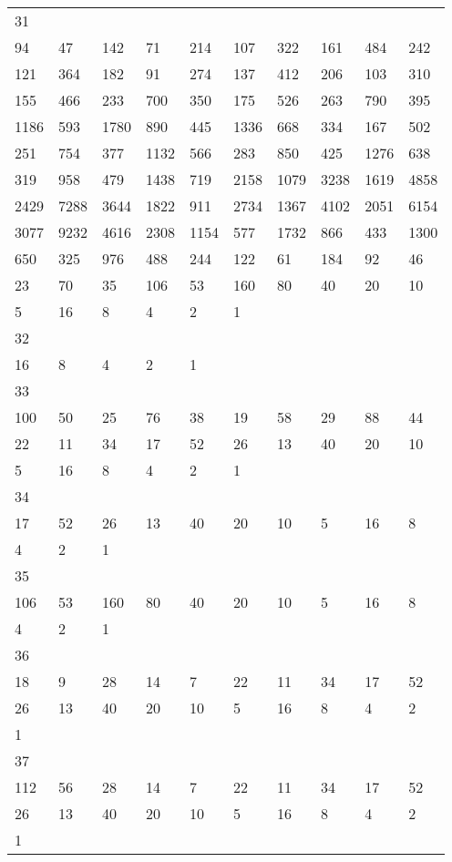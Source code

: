 \begin{longtable}{*{10}{l}}
31&&&&&&&&&\\
94& 47& 142& 71& 214& 107& 322& 161& 484& 242\\
121& 364& 182& 91& 274& 137& 412& 206& 103& 310\\
155& 466& 233& 700& 350& 175& 526& 263& 790& 395\\
1186& 593& 1780& 890& 445& 1336& 668& 334& 167& 502\\
251& 754& 377& 1132& 566& 283& 850& 425& 1276& 638\\
319& 958& 479& 1438& 719& 2158& 1079& 3238& 1619& 4858\\
2429& 7288& 3644& 1822& 911& 2734& 1367& 4102& 2051& 6154\\
3077& 9232& 4616& 2308& 1154& 577& 1732& 866& 433& 1300\\
650& 325& 976& 488& 244& 122& 61& 184& 92& 46\\
23& 70& 35& 106& 53& 160& 80& 40& 20& 10\\
5& 16& 8& 4& 2& 1& \\

32&&&&&&&&&\\
16& 8& 4& 2& 1& \\

33&&&&&&&&&\\
100& 50& 25& 76& 38& 19& 58& 29& 88& 44\\
22& 11& 34& 17& 52& 26& 13& 40& 20& 10\\
5& 16& 8& 4& 2& 1& \\

34&&&&&&&&&\\
17& 52& 26& 13& 40& 20& 10& 5& 16& 8\\
4& 2& 1& \\

35&&&&&&&&&\\
106& 53& 160& 80& 40& 20& 10& 5& 16& 8\\
4& 2& 1& \\

36&&&&&&&&&\\
18& 9& 28& 14& 7& 22& 11& 34& 17& 52\\
26& 13& 40& 20& 10& 5& 16& 8& 4& 2\\
1& \\

37&&&&&&&&&\\
112& 56& 28& 14& 7& 22& 11& 34& 17& 52\\
26& 13& 40& 20& 10& 5& 16& 8& 4& 2\\
1& \\


\end{longtable}

